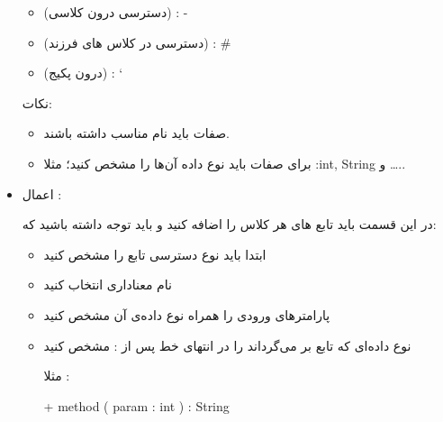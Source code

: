 \documentclass[]{article}
\begin{document}
\begin{itemize}[label=\textcolor{listColor}{$\blacklozenge$}]
\begin{itemize}[label={\textbullet}]
\item
{} (دسترسی درون کلاسی) :    -

\item
{} (دسترسی در کلاس های فرزند) :    \#

\item
{} (درون پکیج) :    \char`~



\end{itemize}

نکات:

\begin{itemize}[label={\textbullet}]

\item
صفات باید نام مناسب داشته باشند.

\item
برای صفات باید نوع داده آن‌ها را مشخص کنید؛ مثلا :int, String و …..


\end{itemize}
   
   \item
   {\fehrest \textcolor{listColor}{اعمال :}}
   
   
   در این قسمت باید تابع های هر کلاس  را اضافه کنید و باید توجه داشته باشید که:
   
\begin{itemize}[label={\textbullet}]

\item
ابتدا باید نوع دسترسی تابع را مشخص کنید

\item
نام معناداری انتخاب کنید

\item
پارامتر‌های ورودی را همراه نوع داده‌ی آن مشخص کنید

\item
نوع داده‌ای که تابع بر می‌گرداند  را  در انتهای خط پس از : مشخص کنید

مثلا :

\begin{center}
\begin{latin}
+ method ( param : int ) : String

\end{latin}
\end{center}



\end{itemize}   


\begin{center}



\end{center}
\end{itemize}
\end{document}
